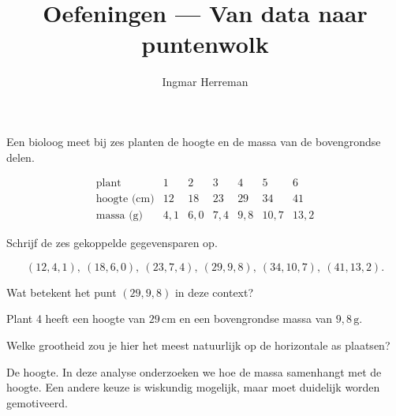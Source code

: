 \documentclass{ximera}
\title{Oefeningen --- Van data naar puntenwolk}
\author{Ingmar Herreman}
\begin{document}




















\maketitle



\begin{oefening}{\oefB \ESS}

Een bioloog meet bij zes planten de hoogte en de massa van de bovengrondse
delen.

\[
\begin{array}{c|rrrrrr}
\text{plant} &1&2&3&4&5&6\\ \hline
\text{hoogte (cm)}&12&18&23&29&34&41\\
\text{massa (g)}&4{,}1&6{,}0&7{,}4&9{,}8&10{,}7&13{,}2
\end{array}
\]

\begin{question}
Schrijf de zes gekoppelde gegevensparen op.

\begin{oplossing}
\[
(12,4{,}1),\ (18,6{,}0),\ (23,7{,}4),\ (29,9{,}8),\
(34,10{,}7),\ (41,13{,}2).
\]
\end{oplossing}
\end{question}

\begin{question}
Wat betekent het punt $(29,9{,}8)$ in deze context?

\begin{oplossing}
Plant 4 heeft een hoogte van $29\,\mathrm{cm}$ en een bovengrondse
massa van $9{,}8\,\mathrm{g}$.
\end{oplossing}
\end{question}

\begin{question}
Welke grootheid zou je hier het meest natuurlijk op de horizontale as
plaatsen?

\begin{oplossing}
De hoogte. In deze analyse onderzoeken we hoe de massa samenhangt met
de hoogte. Een andere keuze is wiskundig mogelijk, maar moet duidelijk
worden gemotiveerd.
\end{oplossing}
\end{question}
\end{oefening}
\end{document}
